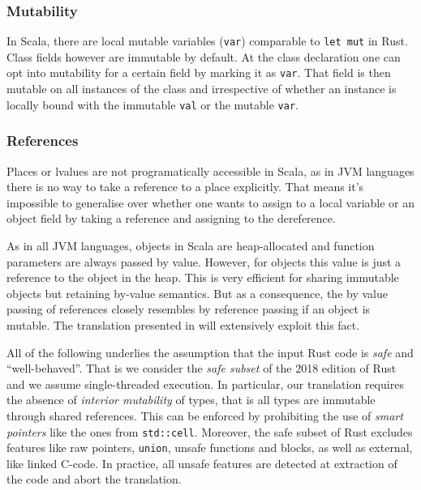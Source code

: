 \subsubsection{Mutability}

In Scala, there are local mutable variables
(\passthrough{\lstinline!var!}) comparable to
\passthrough{\lstinline!let mut!} in Rust. Class fields however are
immutable by default. At the class declaration one can opt into
mutability for a certain field by marking it as
\passthrough{\lstinline!var!}. That field is then mutable on all
instances of the class and irrespective of whether an instance is
locally bound with the immutable \passthrough{\lstinline!val!} or the
mutable \passthrough{\lstinline!var!}.

\subsubsection{References}

Places or lvalues are not programatically accessible in Scala, as in JVM
languages there is no way to take a reference to a place explicitly.
That means it's impossible to generalise over whether one wants to
assign to a local variable or an object field by taking a reference and
assigning to the dereference.

As in all JVM languages, objects in Scala are heap-allocated and
function parameters are always passed by value. However, for objects
this value is just a reference to the object in the heap. This is very
efficient for sharing immutable objects but retaining by-value
semantics. But as a consequence, the by value passing of references
closely resembles by reference passing if an object is mutable. The
translation presented in  will extensively exploit this fact.



All of the following underlies the assumption that the input Rust code
is \emph{safe} and ``well-behaved''. That is we consider the
\emph{safe subset} \cite[section "Unsafety"]{rustref}
of the 2018 edition of Rust and we assume single-threaded
execution. In particular, our translation requires the absence of
\emph{interior mutability} \cite[section "Interior Mutability"]{rustref}
of types, that is all types are immutable through shared
references. This can be enforced by prohibiting the use of \emph{smart
pointers} like the ones from \passthrough{\lstinline!std::cell!}.
Moreover, the safe subset of Rust excludes features like raw pointers,
\passthrough{\lstinline!union!}, unsafe functions and blocks, as well as
external, like linked C-code. In practice, all unsafe features are
detected at extraction of the code and abort the translation.

